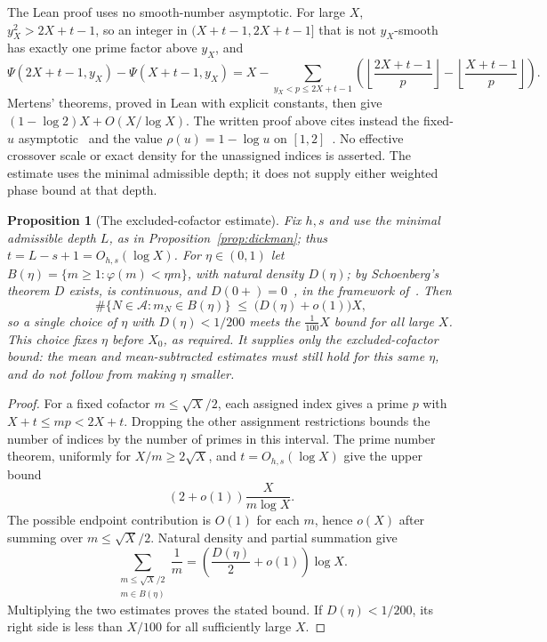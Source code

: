\documentclass[11pt]{article}
\theoremstyle{plain}
\newtheorem{prop}[thm]{Proposition}
\theoremstyle{definition}
\theoremstyle{remark}
\providecommand{\m}[1]{\ensuremath{#1}}
\begin{document}
\noindent
The Lean proof uses no smooth-number asymptotic. For large $X$,
$y_X^2>2X+t-1$, so an integer in $(X+t-1,2X+t-1]$ that is not
$y_X$-smooth has exactly one prime factor above $y_X$, and
\[
 \Psi(2X+t-1,y_X)-\Psi(X+t-1,y_X)
 =X-\sum_{y_X<p\le2X+t-1}
 \left(\left\lfloor\frac{2X+t-1}{p}\right\rfloor
      -\left\lfloor\frac{X+t-1}{p}\right\rfloor\right).
\]
Mertens' theorems, proved in Lean with explicit constants,
then give $(1-\log2)X+O(X/\log X)$. The written proof above
cites instead the fixed-$u$
asymptotic~\cite[(1.1), p.~268]{granville-smooth} and the value
$\rho(u)=1-\log u$ on $[1,2]$~\cite[(1.3), p.~268]{granville-smooth}.
No effective crossover scale or exact density for the unassigned indices
is asserted. The estimate uses the minimal admissible depth; it does not
supply either weighted phase bound at that depth.

\begin{prop}[The excluded-cofactor estimate]\label{prop:badcof}
Fix $h,s$ and use the minimal admissible depth $L$, as in
Proposition~\ref{prop:dickman}; thus $t=L-s+1=O_{h,s}(\log X)$.
For $\eta\in(0,1)$ let $B(\eta)=\{m\ge1:\varphi(m)<\eta m\}$, with natural density
$D(\eta)$; by Schoenberg's theorem $D$ exists, is continuous, and
$D(0+)=0$~\cite[\S17, p.~193]{schoenberg1928}, in the framework
of~\cite[Theorem~1, pp.~318--319, and \S8, p.~323]{schoenberg1936}. Then
\[
  \#\{N\in\mathcal A:m_N\in B(\eta)\}
  \;\le\;\bigl(D(\eta)+o(1)\bigr)X ,
\]
so a single choice of $\eta$ with $D(\eta)<1/200$ meets the $\tfrac{1}{100}X$
bound for all large $X$. This choice fixes $\eta$ before $X_0$, as
required. It supplies only the excluded-cofactor bound: the mean and
mean-subtracted estimates must still hold for this same $\eta$, and do
not follow from making $\eta$ smaller.
\end{prop}

\begin{proof}
For a fixed cofactor $m\le\sqrt X/2$, each assigned index gives a prime
$p$ with $X+t\le mp<2X+t$. Dropping the other assignment restrictions
bounds the number of indices by the number of primes in this interval.
The prime number theorem, uniformly for $X/m\ge2\sqrt X$, and
$t=O_{h,s}(\log X)$ give the upper bound
\[
 (2+o(1))\frac{X}{m\log X}.
\]
The possible endpoint contribution is $O(1)$ for each $m$, hence $o(X)$
after summing over $m\le\sqrt X/2$. Natural density and partial summation
give
\[
 \sum_{\substack{m\le\sqrt X/2\\m\in B(\eta)}}\frac1m
       =\left(\frac{D(\eta)}2+o(1)\right)\log X.
\]
Multiplying the two estimates proves the stated bound. If
$D(\eta)<1/200$, its right side is less than $X/100$ for all sufficiently
large $X$.
\end{proof}
\end{document}

